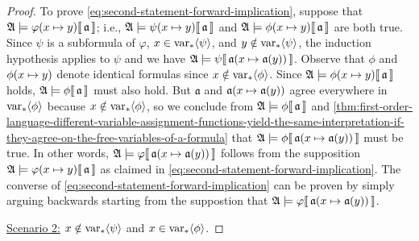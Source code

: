 \begin{proof}
    \vspace{0.3cm}
    \noindent
    To prove \eqref{eq:second-statement-forward-implication}, suppose that \( \folwffsatisfaction{\mathfrak{A}}{ \folfreevariablereplacement{\varphi}{x}{y} }{\mathfrak{a}} \);
    i.e., \( \folwffsatisfaction{\mathfrak{A}}{ \folfreevariablereplacement{\psi}{x}{y} }{ \mathfrak{a}} \)
    and \( \folwffsatisfaction{\mathfrak{A}}{ \folfreevariablereplacement{\phi}{x}{y} }{ \mathfrak{a} } \) are both true.
    Since \( \psi \) is a subformula of \( \varphi \), \( x \in \operatorname{var}_{\ast} \langle\psi\rangle \), and \( y \notin \operatorname{var}_{\ast} \langle\psi\rangle \),
    the induction hypothesis applies to \( \psi \) and we have 
    \( \folwffsatisfaction{\mathfrak{A}}{\psi}{ \folmodifiedvariableassignmentfunction{\mathfrak{a}}{x}{\mathfrak{a}(y)} } \).
    Observe that \( \phi \) and \( \folfreevariablereplacement{\phi}{x}{y} \) denote identical formulas since \( x \notin \operatorname{var}_{\ast} \langle\phi\rangle \).
    Since \( \folwffsatisfaction{\mathfrak{A}}{ \folfreevariablereplacement{\phi}{x}{y} }{\mathfrak{a}} \) holds,
    \(  \mathfrak{A} \models \phi\llbracket\, \mathfrak{a} \,\rrbracket \) must also hold.
    But \( \mathfrak{a} \) and \( \folmodifiedvariableassignmentfunction{\mathfrak{a}}{x}{\mathfrak{a}(y)} \) agree everywhere in \( \operatorname{var}_{\ast} \langle\phi\rangle \)
    because \( x \notin \operatorname{var}_{\ast} \langle\phi\rangle \),
    so we conclude from \(  \mathfrak{A} \models \phi\llbracket\, \mathfrak{a} \,\rrbracket \) and
    \cref{thm:first-order-language-different-variable-assignment-functions-yield-the-same-interpretation-if-they-agree-on-the-free-variables-of-a-formula}
    that \( \folwffsatisfaction{\mathfrak{A}}{\phi}{ \folmodifiedvariableassignmentfunction{\mathfrak{a}}{x}{\mathfrak{a}(y)} } \) must be true.
    In other words,
    \( \folwffsatisfaction{\mathfrak{A}}{\varphi}{ \folmodifiedvariableassignmentfunction{\mathfrak{a}}{x}{\mathfrak{a}(y)} } \)
    follows from the supposition
    \( \folwffsatisfaction{\mathfrak{A}}{ \folfreevariablereplacement{\varphi}{x}{y} }{\mathfrak{a}} \)
    as claimed in \eqref{eq:second-statement-forward-implication}.
    The converse of \eqref{eq:second-statement-forward-implication} can be proven by simply arguing backwards starting
    from the suppostion that \( \folwffsatisfaction{\mathfrak{A}}{\varphi}{ \folmodifiedvariableassignmentfunction{\mathfrak{a}}{x}{\mathfrak{a}(y)} } \).

    \vspace{0.3cm}
    \noindent
    \underline{Scenario 2:} \( x \notin \operatorname{var}_{\ast} \langle\psi\rangle \) and \( x \in \operatorname{var}_{\ast} \langle\phi\rangle \).


\end{proof}
